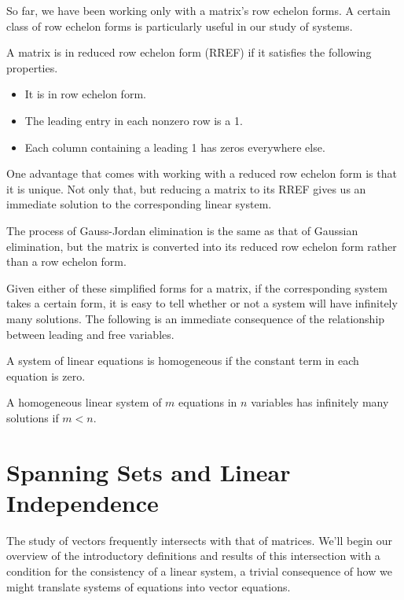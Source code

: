 \documentclass[../m073main.tex]{subfiles}
\begin{document}
So far, we have been working only with a matrix's row echelon forms.
A certain class of row echelon forms is particularly useful in our study of systems.

\begin{definition}
	A matrix is in reduced row echelon form (RREF) if it satisfies the following properties.
	\begin{itemize}
		\item It is in row echelon form.
		\item The leading entry in each nonzero row is a 1.
		\item Each column containing a leading 1 has zeros everywhere else.
	\end{itemize}
\end{definition}

One advantage that comes with working with a reduced row echelon form is that it is unique.
Not only that, but reducing a matrix to its RREF gives us an immediate solution to the corresponding linear system.

\begin{definition}
	The process of Gauss-Jordan elimination is the same as that of Gaussian elimination, but the matrix is converted into its reduced row echelon form rather than a row echelon form.
\end{definition}

Given either of these simplified forms for a matrix, if the corresponding system takes a certain form, it is easy to tell whether or not a system will have infinitely many solutions.
The following is an immediate consequence of the relationship between leading and free variables.

\begin{definition}
	A system of linear equations is homogeneous if the constant term in each equation is zero.
\end{definition}

\begin{theorem}
	A homogeneous linear system of $m$ equations in $n$ variables has infinitely many solutions if $m < n$.
\end{theorem}

\section{Spanning Sets and Linear Independence}
The study of vectors frequently intersects with that of matrices.
We'll begin our overview of the introductory definitions and results of this intersection with a condition for the consistency of a linear system, a trivial consequence of how we might translate systems of equations into vector equations.
\end{document}
